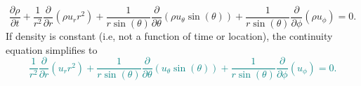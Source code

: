 \documentclass[12pt]{article}
\begin{document}
\begin{ex}
\begin{solution}
{  \begin{equation*}
    \frac{\partial\rho}{\partial t}+\frac{1}{r^2}\frac{\partial}{\partial r}(\rho u_r r^2)+\frac{1}{r\sin(\theta)}\frac{\partial}{\partial\theta}(\rho u_{\theta}\sin(\theta))+\frac{1}{r\sin(\theta)}\frac{\partial}{\partial\phi}(\rho u_{\phi})=0.
  \end{equation*}}%
  If density is constant (i.e, not a function of time or location), the continuity equation simplifies to\textcolor{teal}{
  \begin{equation*}
    \frac{1}{r^2}\frac{\partial}{\partial r}(u_r r^2)+\frac{1}{r\sin(\theta)}\frac{\partial}{\partial\theta}(u_{\theta}\sin(\theta))+\frac{1}{r\sin(\theta)}\frac{\partial}{\partial\phi}(u_{\phi})=0.
  \end{equation*}}
  
\end{solution}

\end{ex}
\end{document}
